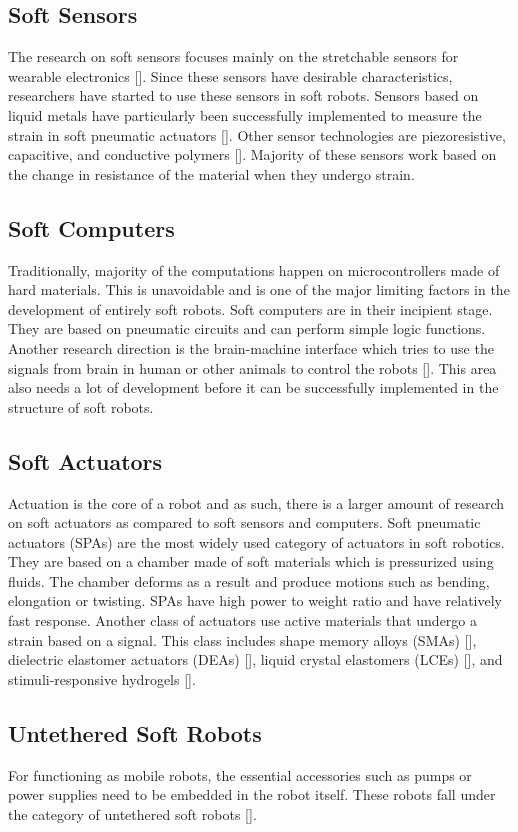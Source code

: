 \subsection{Soft Sensors}
The research on soft sensors focuses mainly on the stretchable sensors for wearable electronics []. Since these sensors have desirable characteristics, researchers have started to use these sensors in soft robots. Sensors based on liquid metals have particularly been successfully implemented to measure the strain in soft pneumatic actuators []. Other sensor technologies are piezoresistive, capacitive, and conductive polymers []. Majority of these sensors work based on the change in resistance of the material when they undergo strain. 
\subsection{Soft Computers}
Traditionally,  majority of the computations happen on microcontrollers made of hard materials. This is unavoidable and is one of the major limiting factors in the development of entirely soft robots. Soft computers are in their incipient stage. They are based on pneumatic circuits and can perform simple logic functions. Another research direction is the brain-machine interface which tries to use the signals from  brain in human or other animals to control the robots []. This area also needs a lot of development before it can be successfully implemented in the structure of soft robots. 
\subsection{Soft Actuators}
Actuation is the core of a robot and as such, there is a larger amount of research on soft actuators as compared to soft sensors and computers. Soft pneumatic actuators (SPAs) \cite{Gorissen2017, branyan2017soft} are the most widely used category of actuators in soft robotics. They are based on a chamber made of soft materials which is pressurized using fluids. The chamber deforms as a result and produce motions such as bending, elongation or twisting. SPAs have high power to weight ratio and have relatively fast response.  Another class of actuators use active materials that undergo a strain based on a signal. This class includes shape memory alloys (SMAs) [], dielectric elastomer actuators (DEAs) [], liquid crystal elastomers (LCEs) [], and stimuli-responsive hydrogels []. 
 
\subsection{Untethered Soft Robots}
For functioning as mobile robots, the essential accessories such as pumps or power supplies need to be embedded in the robot itself. These robots fall under the category of untethered soft robots [].  
